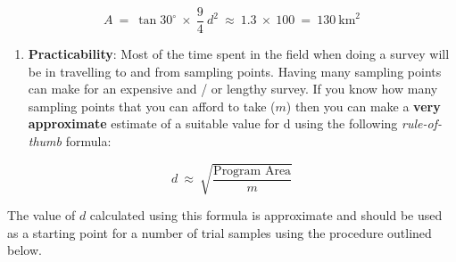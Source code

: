 \documentclass[12pt,a4paper]{book}
\providecommand{\tightlist}{%
  \setlength{\itemsep}{0pt}\setlength{\parskip}{0pt}}
\theoremstyle{definition}
\theoremstyle{definition}
\theoremstyle{definition}
\theoremstyle{remark}
\begin{document}
\[ A ~ = ~ \tan30^ \circ ~ \times ~ \frac{9}{4} ~ d ^ 2 ~ \approx ~ 1.3 ~ \times ~ 100 ~ = ~ 130 ~ \text{km} ^ 2 \]

\begin{enumerate}
\def\labelenumi{\arabic{enumi}.}
\setcounter{enumi}{1}
\tightlist
\item
  \textbf{Practicability}: Most of the time spent in the field when
  doing a survey will be in travelling to and from sampling points.
  Having many sampling points can make for an expensive and / or lengthy
  survey. If you know how many sampling points that you can afford to
  take (\(m\)) then you can make a \textbf{very approximate} estimate of
  a suitable value for d using the following \emph{rule-of-thumb}
  formula:
\end{enumerate}

\[ d ~ \approx ~ \sqrt{\frac{\text{Program Area}}{m}} \]

The value of \(d\) calculated using this formula is approximate and
should be used as a starting point for a number of trial samples using
the procedure outlined below.

~
\end{document}
